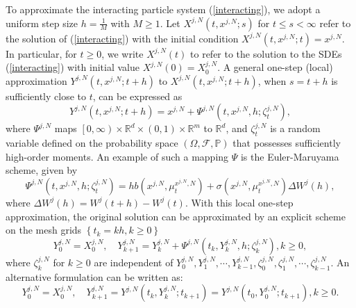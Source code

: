 \documentclass[12pt]{article}
\numberwithin{equation}{section}
\begin{document}
To approximate the interacting particle system (\ref{interacting}), we adopt a uniform step size $h=\tfrac{1}{M}$ with  $M \geq 1$. Let $X^{j,N}\left(t, x^{j,N} ; s\right)$ for $t \leq s<\infty$ refer to the solution of (\ref{interacting}) with  the initial condition $X^{j,N}\left(t, x^{j,N} ; t\right)=x^{j,N}$. In particular, for $t \geq 0$, we write $X^{j,N}\left(t\right)$ to refer to the solution to the SDEs (\ref{interacting}) with initial value $X^{j,N}\left(0\right)=X^{j,N}_0$. A general one-step (local) approximation $Y^{j,N}\left(t, x^{j,N} ; t+h\right)$ to $X^{j,N}\left(t, x^{j,N} ; t+h\right)$, when  $s=t+h $ 
is sufficiently close to $t$, can be expressed as
\begin{equation}\tag{3.6}\label{4.1}
Y^{j,N}\left(t, x^{j,N} ; t+h\right)=x^{j,N}+\varPsi^{j,N}\left(t, x^{j,N}, h ; \zeta ^{j,N}_t\right),
\end{equation}
where $\varPsi^{j,N}$ maps $\left[0, \infty\right) \times \mathbb{R}^d \times\left(0, 1\right) \times \mathbb{R}^m$ to $\mathbb{R}^d$, and $\zeta ^{j,N}_t$ is a random variable defined on the probability space $\left(\Omega, \mathcal{F}, \mathbb{P}\right)$ that possesses sufficiently high-order moments. 
An example of such a mapping $\varPsi$ is  the 
Euler-Maruyama scheme, given by
\begin{equation}\tag{3.7}\label{4.2}
\varPsi^{j,N}\left(t, x^{j,N}, h ; \zeta ^{j,N}_t\right)=hb\left(x^{j,N},\mu^{x^{j,N},N} _t \right)+\sigma\left(x^{j,N},\mu^{x^{j,N},N}_t\right) \Delta W^{j}\left(h\right),
\end{equation}
where $\Delta W^{j}\left(h\right)=W^{j}\left(t+h\right)-W^{j}\left(t\right)$.
With this local one-step approximation, the original solution can be approximated by an explicit scheme  on the mesh grids $\left\{t_k=k h, k \geq 0\right\}$
\begin{equation}\tag{3.8}\label{4.3}
Y^{j,N}_0=X^{j,N}_0, \quad Y^{j,N}_{k+1}=Y^{j,N}_k+\varPsi^{j,N}\left(t_k, Y^{j,N}_k, h ; \zeta^{j,N} _k\right), k \geq 0,
\end{equation}
where $\zeta^{j,N}_k$ for $k \geq 0$ are independent of $Y^{j,N}_0, Y^{j,N}_1, \cdots, Y^{j,N}_{k-1}, \zeta^{j,N}_0, \zeta^{j,N}_1, \cdots, \zeta^{j,N}_{k-1}$. An alternative formulation can be written as:
\begin{equation}\tag{3.9}\label{4.4}
Y^{j,N}_0=X^{j,N}_0, \quad Y^{j,N}_{k+1}=Y^{j,N}\left(t_k, Y^{j,N}_k ; t_{k+1}\right)=Y^{j,N}\left(t_0, Y^{j,N}_0 ; t_{k+1}\right), k \geq 0.
\end{equation}
\end{document}
